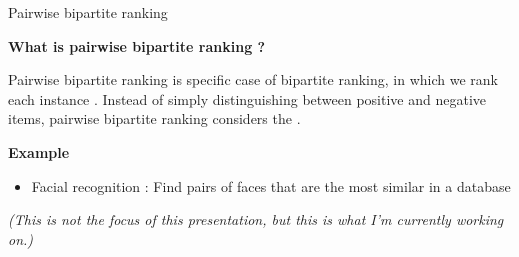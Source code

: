 \begin{frame}{Pairwise bipartite ranking}

    {\large\textbf{What is pairwise bipartite ranking ?}}

    Pairwise bipartite ranking is specific case of bipartite ranking, in which we rank each instance .  Instead of simply distinguishing between positive and negative items, pairwise bipartite ranking considers the . 

    \vspace{0.3cm}

    {\large\textbf{Example}}
    
    \begin{itemize}
        \item Facial recognition : Find pairs of faces that are the most similar in a database
    \end{itemize}

    \textit{(This is not the focus of this presentation, but this is what I'm currently working on.)}

    
\end{frame}


